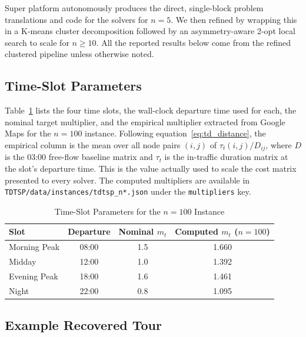 \documentclass[conference]{IEEEtran}
\begin{document}
Super platform autonomously produces the direct, single-block problem translations and code for the solvers for $n=5$. We then refined by wrapping this in a K-means cluster decomposition followed by an asymmetry-aware 2-opt local search to scale for $n \geq 10$. All the reported results below come from the refined clustered pipeline unless otherwise noted.

\subsection{Time-Slot Parameters}
\label{subsec:slot_params}

Table~\ref{tab:slot_params} lists the four time slots, the wall-clock departure time used for each, the nominal target multiplier, and the empirical multiplier extracted from Google Maps for the $n=100$  instance. Following equation~\eqref{eq:td_distance}, the empirical column is the mean over all node pairs $(i,j)$ of $\tau_t(i,j) / D_{ij}$, where $D$ is the 03:00 free-flow baseline matrix and $\tau_t$ is the in-traffic duration matrix at the slot's departure time. This is the value actually used to scale the cost matrix presented to every solver. The computed multipliers are available in \texttt{TDTSP/data/instances/tdtsp\_n*.json} under the \texttt{multipliers} key.

\begin{table}[htbp]
\caption{Time-Slot Parameters for the $n{=}100$ Instance}
\begin{center}
\begin{tabular}{|l|c|c|c|}
\hline
\textbf{Slot} & \textbf{Departure} & \textbf{Nominal $m_t$} & \textbf{Computed $m_t$ ($n{=}100$)} \\
\hline
Morning Peak  & 08:00 & 1.5 & 1.660 \\
\hline
Midday        & 12:00 & 1.0 & 1.392 \\
\hline
Evening Peak  & 18:00 & 1.6 & 1.461 \\
\hline
Night         & 22:00 & 0.8 & 1.095 \\
\hline
\end{tabular}
\label{tab:slot_params}
\end{center}
\end{table}



\subsection{Example Recovered Tour}
\label{subsec:example_tour}
\end{document}
